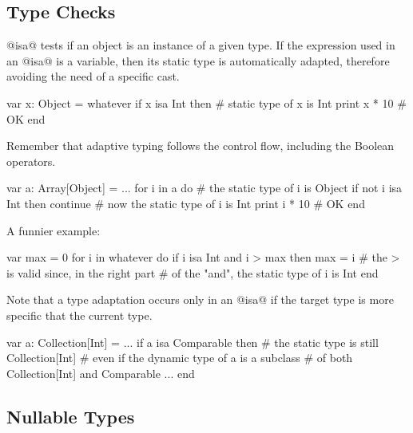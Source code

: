
\subsection{Type Checks}\label{isa}

@isa@ tests if an object is an instance of a given type.
If the expression used in an @isa@ is a variable, then its static type is automatically adapted, therefore avoiding the need of a specific cast.

\begin{lst}
var x: Object = whatever
if x isa Int then
	# static type of x is Int
	print x * 10 # OK
end
\end{lst}

Remember that adaptive typing follows the control flow, including the Boolean operators.

\begin{lst}
var a: Array[Object] = ...
for i in a do
	# the static type of i is Object 
	if not i isa Int then continue
	# now the static type of i is Int
	print i * 10 # OK
end
\end{lst}

A funnier example:
\begin{lst}
var max = 0
for i in whatever do
	if i isa Int and i > max then max = i
	# the > is valid since, in the right part
	# of the "and", the static type of i is Int
end
\end{lst}

Note that a type adaptation occurs only in an @isa@ if the target type is more specific that the current type.
\begin{lst}
var a: Collection[Int] = ...
if a isa Comparable then
	# the static type is still Collection[Int]
	# even if the dynamic type of a is a subclass
	# of both Collection[Int] and Comparable
	...
end
\end{lst}

\subsection{Nullable Types}\label{null}\label{nullable}\label{or else}\label{not null}

